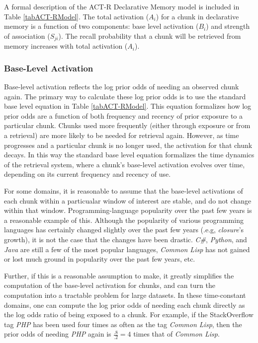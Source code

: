 \documentclass[man,floatsintext]{apa6}
\begin{document}
A formal description of the ACT-R Declarative Memory model is included in Table \ref{tabACT-RModel}.
The total activation ($A_{i}$) for a chunk in declarative memory is a function of two components: base level activation ($B_{i}$) and strength of association ($S_{ji}$).
The recall probability that a chunk will be retrieved from memory increases with total activation ($A_{i}$).

\subsubsection{Base-Level Activation}

Base-level activation reflects the log prior odds of needing an observed chunk again.
The primary way to calculate these log prior odds is to use the standard base level equation in Table \ref{tabACT-RModel}.
This equation formalizes how log prior odds are a function of both frequency and recency of prior exposure to a particular chunk.
Chunks used more frequently (either through exposure or from a retrieval) are more likely to be needed for retrieval again.
However, as time progresses and a particular chunk is no longer used, the activation for that chunk decays.
In this way the standard base level equation formalizes the time dynamics of the retrieval system, where a chunk's base-level activation evolves over time, depending on its current frequency and recency of use.

For some domains, it is reasonable to assume that the base-level activations of each chunk within a particualar window of interest are stable, and do not change within that window.
Programming-language popularity over the past few years is a reasonable example of this.
Although the popularity of various programming languages has certainly changed slightly over the past few years (.e.g, \emph{closure}'s growth), it is not the case that the changes have been drastic.
\emph{C\#}, \emph{Python}, and \emph{Java} are still a few of the most popular languages, \emph{Common Lisp} has not gained or lost much ground in popularity over the past few years, etc.

Further, if this is a reasonable assumption to make, it greatly simplifies the computation of the base-level activation for chunks, and can turn the computation into a tractable problem for large datasets.
In these time-constant domains, one can compute the log prior odds of needing each chunk directly as the log odds ratio of being exposed to a chunk.
For example, if the StackOverflow tag \emph{PHP} has been used four times as often as the tag \emph{Common Lisp}, then the prior odds of needing \emph{PHP} again is $\frac{.8}{.2}=4$ times that of \emph{Common Lisp}.
\end{document}
